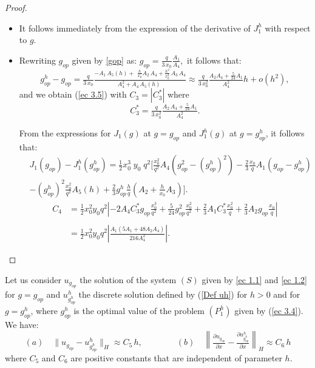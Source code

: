 \documentclass[axioms,article,submit,moreauthors]{Definitions/mdpi}
\newcommand\pder[2][]{\ensuremath{\tfrac{\partial#1}{\partial#2}}}
\begin{document}
    
  \begin{proof} $ $
    

    \begin{itemize}
    \item[(a)] { It follows immediately from the expression of the derivative of $J^h_1$ with respect to $g$.}
    
\item[(b)] Rewriting $g_{op}$ given by \eqref{gop} as:
    	  $g_{op}= \tfrac{q}{3\,x_0} \tfrac{A_1 }{A_4},$
    	  it follows that:
    	  \[   {g^h_{op}}-g_{op} = \tfrac{q}{3\,x_0}  \tfrac {-A_1\,A_5(h)+\,\,\tfrac{h}{x_0} A_2\, A_4 + \tfrac{h^2}{x_0^2}\,A_3\,A_4   }{A_4^2 + A_4 \,A_5(h)\,\,} \approx\tfrac{q}{3\,x_0^2} \tfrac{  A_2A_4+\tfrac{5}{24}A_1 }{ A_4^2} h+o(h^2),\]
    and we obtain (\ref{ec 3.5}) with $C_3=|C_3^*|$ where \begin{equation}\label{C3*}
    C_3^*=\tfrac{q}{3\,x_0^2} \tfrac{ A_2 \,A_4+ \tfrac{5}{24}A_1 }{A_4^2}. 
    \end{equation}
  
   From the expressions for $J_1(g)$ at $g=g_{op}$ and ${J^h_{1}(g)}$ at ${ g= g^h_{op}}$, it follows that:
    \[\begin{array}{ll}
&    J_1(g_{op})- {J^h_{1}(g^h_{op})} =\tfrac{1}{2}x_0^3\;y_0\; q^2 \bigg[\tfrac{x_0^2}{q^2}A_4(g_{op} ^2-({g^{h}_{op}})^2)  -\tfrac{2}{3}\tfrac{x_0}{q} A_1 (g_{op}-{g^h_{op}})\\
    & -({g^h_{op}})^2 \tfrac{x_0^2}{q^2}A_5(h)+\tfrac{2}{3} {g^h_{op}} \tfrac{h}{q} \left( A_2+\tfrac{h}{x_0}A_3\right)\bigg]. 
\end{array}\]
   \[\begin{array}{ll}
   C_4 &= \tfrac{1}{2} x_0^2 y_0 q^2  \left|-2A_4 C_3^* g_{op}\tfrac{x_0^3}{q^2} +\tfrac{5}{24} g_{op}^2\tfrac{x_0^2}{ q^2}+\tfrac{2}{3}A_1 C_3^* \tfrac{x_0^2}{q}+\tfrac{2}{3} A_2 g_{op} \tfrac{x_0}{q} \right| \\
   \\
   &= \tfrac{1}{2} x_0^2 y_0 q^2  \left|\tfrac{A_1(5A_1+48 A_2A_4)}{216 A_4^2}\right|.
   \end{array}\]

    \end{itemize}   
   \end{proof}
     
\begin{Lemma}\label{lema-dif norm ugop-uhghop}
 Let us consider $u_{g_{op}}$ the solution of { the system $(S)$ given by } \eqref{ec 1.1} and \eqref{ec 1.2} for $g= g_{op}$ and {$u^h_{g^h_{op}}$}
 the discrete solution defined by (\ref{Def uh}) for $h>0$ and for {$g=g^h_{op}$, where $g^h_{op}$}  is  the optimal value  of the problem ${(P^h_{1})}$ given by
 (\ref{ec 3.4}). We have: 
  \[   (a) \quad
  \lVert u_{g_{op}}- {u^h_{g^h_{op}}}    \rVert _H \approx C_5\, h,\qquad \qquad
  			        (b) \quad
  \left\lVert \pder[u_{g_{op}}]{x}-\pder[ {u^h_{g^h_{op}}}   ]{x}     \right\rVert _H \approx C_6\, h 
   \]
 \noindent where $C_5$ and $C_6$ are {positive constants that are independent of parameter $h$.}
   \end{Lemma}  
\end{document}
